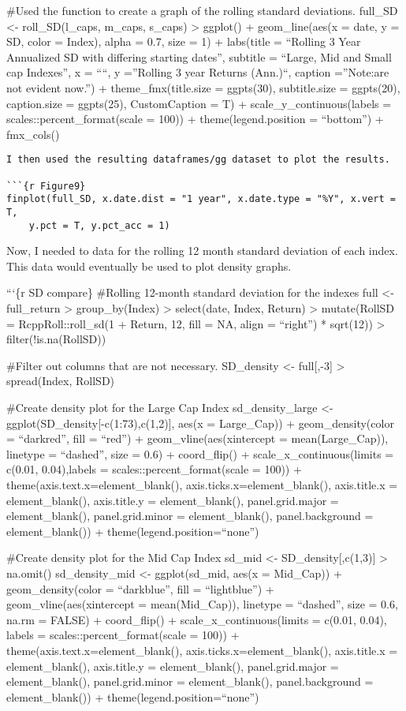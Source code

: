 \documentclass[
]{article}
\begin{document}
\#Used the function to create a graph of the rolling standard
deviations. full\_SD \textless- roll\_SD(l\_caps, m\_caps, s\_caps)
\textbar\textgreater{} ggplot() + geom\_line(aes(x = date, y = SD, color
= Index), alpha = 0.7, size = 1) + labs(title = ``Rolling 3 Year
Annualized SD with differing starting dates'', subtitle = ``Large, Mid
and Small cap Indexes'', x = ````, y =''Rolling 3 year Returns (Ann.)``,
caption =''Note:\nDistortions are not evident now.'') +
theme\_fmx(title.size = ggpts(30), subtitle.size = ggpts(20),
caption.size = ggpts(25), CustomCaption = T) +
scale\_y\_continuous(labels = scales::percent\_format(scale = 100)) +
theme(legend.position = ``bottom'') + fmx\_cols()

\begin{verbatim}
I then used the resulting dataframes/gg dataset to plot the results. 

```{r Figure9}
finplot(full_SD, x.date.dist = "1 year", x.date.type = "%Y", x.vert = T, 
    y.pct = T, y.pct_acc = 1)
\end{verbatim}

Now, I needed to data for the rolling 12 month standard deviation of
each index. This data would eventually be used to plot density graphs.

```\{r SD compare\} \#Rolling 12-month standard deviation for the
indexes full \textless- full\_return \textbar\textgreater{}
group\_by(Index) \textbar\textgreater{} select(date, Index, Return)
\textbar\textgreater{} mutate(RollSD = RcppRoll::roll\_sd(1 + Return,
12, fill = NA, align = ``right'') * sqrt(12)) \textbar\textgreater{}
filter(!is.na(RollSD))

\#Filter out columns that are not necessary. SD\_density \textless-
full{[},-3{]} \textbar\textgreater{} spread(Index, RollSD)

\#Create density plot for the Large Cap Index sd\_density\_large
\textless- ggplot(SD\_density{[}-c(1:73),c(1,2){]}, aes(x = Large\_Cap))
+ geom\_density(color = ``darkred'', fill = ``red'') +
geom\_vline(aes(xintercept = mean(Large\_Cap)), linetype = ``dashed'',
size = 0.6) + coord\_flip() + scale\_x\_continuous(limits = c(0.01,
0.04),labels = scales::percent\_format(scale = 100)) +
theme(axis.text.x=element\_blank(), axis.ticks.x=element\_blank(),
axis.title.x = element\_blank(), axis.title.y = element\_blank(),
panel.grid.major = element\_blank(), panel.grid.minor =
element\_blank(), panel.background = element\_blank()) +
theme(legend.position=``none'')

\#Create density plot for the Mid Cap Index sd\_mid \textless-
SD\_density{[},c(1,3){]} \textbar\textgreater{} na.omit()
sd\_density\_mid \textless- ggplot(sd\_mid, aes(x = Mid\_Cap)) +
geom\_density(color = ``darkblue'', fill = ``lightblue'') +
geom\_vline(aes(xintercept = mean(Mid\_Cap)), linetype = ``dashed'',
size = 0.6, na.rm = FALSE) + coord\_flip() + scale\_x\_continuous(limits
= c(0.01, 0.04), labels = scales::percent\_format(scale = 100)) +
theme(axis.text.x=element\_blank(), axis.ticks.x=element\_blank(),
axis.title.x = element\_blank(), axis.title.y = element\_blank(),
panel.grid.major = element\_blank(), panel.grid.minor =
element\_blank(), panel.background = element\_blank()) +
theme(legend.position=``none'')
\end{document}
